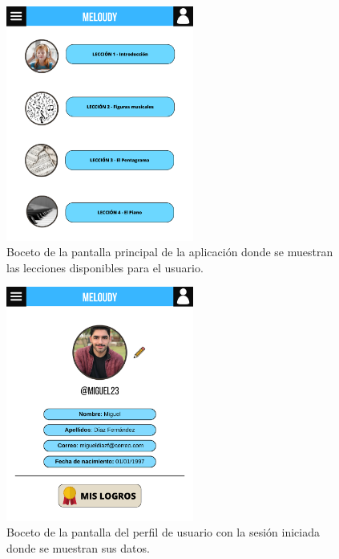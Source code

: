 \begin{figure}[H]
    \centering
    \centerline{\includegraphics[width=0.55\textwidth, frame]{imagenes/c6/1.png}}
    \caption{Boceto de la pantalla principal de la aplicación donde se muestran las lecciones disponibles para el usuario.}
    \label{fig:pantallaprincipal}
\end{figure}


\begin{figure}[H]
    \centering
    \centerline{\includegraphics[width=0.55\textwidth, frame]{imagenes/c6/2.png}}
    \caption{Boceto de la pantalla del perfil de usuario con la sesión iniciada donde se muestran sus datos.}
    \label{fig:perfil}
\end{figure}


